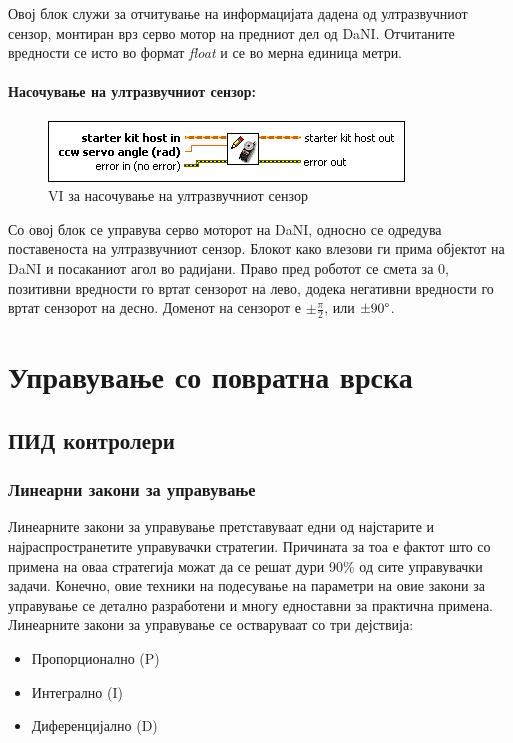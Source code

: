 \documentclass{article}
\begin{document}
Овој блок служи за отчитување на информацијата дадена од ултразвучниот сензор, монтиран врз серво мотор на предниот дел од DaNI. Отчитаните вредности се исто во формат \textit{float} и се во мерна единица метри.

\paragraph{Насочување на ултразвучниот сензор:\\}
\begin{figure}[H]
\includegraphics[width=0.45\linewidth]{write_servo.png}
\caption{VI за насочување на ултразвучниот сензор}
\label{fig:write_servo.png}
\raggedright
\end{figure}
Со овој блок се управува серво моторот на DaNI, односно се одредува поставеноста на ултразвучниот сензор. Блокот како влезови ги прима објектот на DaNI и посаканиот агол во радијани. Право пред роботот се смета за 0, позитивни вредности го вртат сензорот на лево, додека негативни вредности го вртат сензорот на десно. Доменот на сензорот е $ \pm \frac{\pi}{2}$, или $\pm 90 \degree$.

\newpage
\section{Управување со повратна врска}
\subsection{ПИД контролери}
\subsubsection{Линеарни закони за управување}
Линеарните закони за управување претставуваат едни од најстарите и најраспространетите управувачки стратегии. Причината за тоа е фактот што со примена на оваа стратегија можат да се решат дури 90\% од сите управувачки задачи. Конечно, овие техники на подесување на параметри на овие закони за управување се детално разработени и многу едноставни за практична примена.\\
Линеарните закони за управување се остваруваат со три дејствија:
\begin{itemize}
	\item Пропорционално (P)
	\item Интегрално (I)
	\item Диференцијално (D)
\end{itemize}
\end{document}
